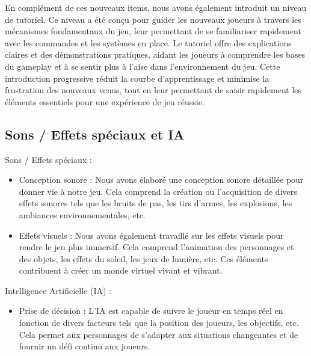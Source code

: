 \documentclass[
	article,			%
	11pt,				%
	oneside,			%
	a4paper,			%
	chapter=TITLE,
	french,			%
	sumario=tradicional
	]{base_nt}
\begin{document}
En complément de ces nouveaux items, nous avons également introduit un niveau de tutoriel. Ce niveau a été conçu pour guider les nouveaux joueurs à travers les mécanismes fondamentaux du jeu, leur permettant de se familiariser rapidement avec les commandes et les systèmes en place. Le tutoriel offre des explications claires et des démonstrations pratiques, aidant les joueurs à comprendre les bases du gameplay et à se sentir plus à l'aise dans l'environnement du jeu. Cette introduction progressive réduit la courbe d'apprentissage et minimise la frustration des nouveaux venus, tout en leur permettant de saisir rapidement les éléments essentiels pour une expérience de jeu réussie.

\newpage

\subsection{Sons / Effets spéciaux et IA}

Sons / Effets spéciaux :

\begin{itemize}
    \item Conception sonore : Nous avons élaboré une conception sonore détaillée pour donner vie à notre jeu. Cela comprend la création ou l'acquisition de divers effets sonores tels que les bruits de pas, les tirs d'armes, les explosions, les ambiances environnementales, etc.
    \item Effets visuels : Nous avons également travaillé sur les effets visuels pour rendre le jeu plus immersif. Cela comprend l'animation des personnages et des objets, les effets du soleil, les jeux de lumière, etc. Ces éléments contribuent à créer un monde virtuel vivant et vibrant.
\end{itemize}

Intelligence Artificielle (IA) :

\begin{itemize}
    \item Prise de décision : L'IA est capable de suivre le joueur en temps réel en fonction de divers facteurs tels que la position des joueurs, les objectifs, etc. Cela permet aux personnages de s'adapter aux situations changeantes et de fournir un défi continu aux joueurs.
\end{itemize}

\vspace{2.3cm}

\newpage

\vspace*{5cm}
\end{document}
